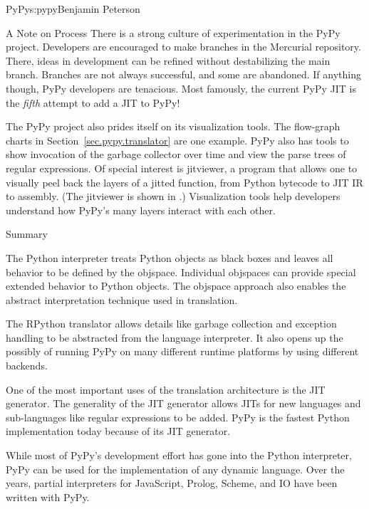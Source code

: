 \begin{aosachapter}{PyPy}{s:pypy}{Benjamin Peterson}
\begin{aosasect1}{A Note on Process}
There is a strong culture of experimentation in the PyPy project. Developers are
encouraged to make branches in the Mercurial repository. There, ideas in
development can be refined without destabilizing the main branch. Branches are
not always successful, and some are abandoned. If anything though, PyPy
developers are tenacious. Most famously, the current PyPy JIT is the
\emph{fifth} attempt to add a JIT to PyPy!

The PyPy project also prides itself on its visualization tools. The flow-graph
charts in Section~\ref{sec.pypy.translator} are one example.  PyPy also has
tools to show invocation of the garbage collector over time and view the parse
trees of regular expressions. Of special interest is jitviewer, a program that
allows one to visually peel back the layers of a jitted function, from Python
bytecode to JIT IR to assembly. (The jitviewer is shown in
.) Visualization tools help developers understand
how PyPy's many layers interact with each other.


\end{aosasect1}

\begin{aosasect1}{Summary}

The Python interpreter treats Python objects as black boxes and leaves all
behavior to be defined by the objspace. Individual objspaces can provide special
extended behavior to Python objects. The objspace approach also enables the
abstract interpretation technique used in translation.

The RPython translator allows details like garbage collection and exception
handling to be abstracted from the language interpreter. It also opens up the
possibly of running PyPy on many different runtime platforms by using different
backends.

One of the most important uses of the translation architecture is the JIT
generator. The generality of the JIT generator allows JITs for new languages and
sub-languages like regular expressions to be added. PyPy is the fastest Python
implementation today because of its JIT generator.

While most of PyPy's development effort has gone into the Python interpreter,
PyPy can be used for the implementation of any dynamic language. Over the years,
partial interpreters for JavaScript, Prolog, Scheme, and IO have been written
with PyPy.


\end{aosasect1}
\end{aosachapter}
